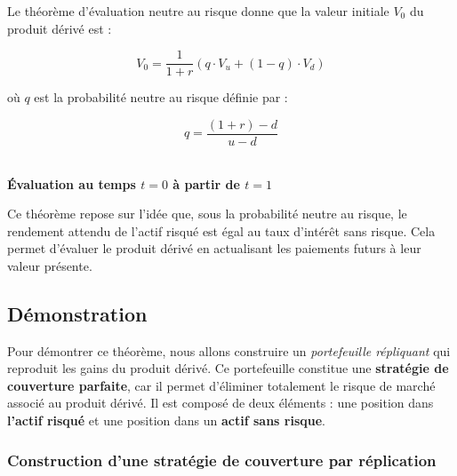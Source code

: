 \documentclass[12pt,a4paper]{article}
\begin{document}
Le théorème d'évaluation neutre au risque donne que la valeur initiale \( V_0 \) du produit dérivé est :

\begin{equation}
    \boxed{V_0 = \frac{1}{1 + r} \left( q \cdot V_u + (1 - q) \cdot V_d \right)}
\end{equation}

où \( q \) est la probabilité neutre au risque définie par :

\begin{equation}
    \boxed{q = \frac{(1 + r) - d}{u - d}}
\end{equation}

\vspace{1cm}

\begin{center}
    \\
    \textbf{Évaluation au temps $t = 0$ à partir de $t = 1$}
\end{center}

Ce théorème repose sur l'idée que, sous la probabilité neutre au risque, le rendement attendu de l'actif risqué est égal au taux d'intérêt sans risque. Cela permet d'évaluer le produit dérivé en actualisant les paiements futurs à leur valeur présente.

\subsection{Démonstration}

Pour démontrer ce théorème, nous allons construire un \textit{portefeuille répliquant} qui reproduit les gains du produit dérivé. Ce portefeuille constitue une \textbf{stratégie de couverture parfaite}, car il permet d’éliminer totalement le risque de marché associé au produit dérivé.
Il est composé de deux éléments : une position dans \textbf{l'actif risqué} et une position dans un \textbf{actif sans risque}.

\subsubsection{Construction d'une stratégie de couverture par réplication}
\end{document}
